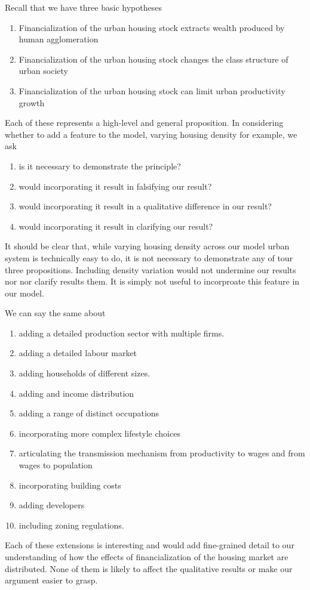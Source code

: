 Recall that we have three basic hypotheses
\begin{enumerate}
    \item Financialization of the urban housing stock extracts wealth produced by human agglomeration 
    \item Financialization of the urban housing stock changes the class structure of urban society
    \item Financialization of the urban housing stock can limit urban productivity growth
\end{enumerate}
Each  of these represents a high-level and general proposition. In considering whether to add a feature to the model, varying housing density for example, we ask 
\begin{enumerate}
    \item is it necessary to demonstrate the principle? 
    \item would incorporating it result in falsifying our result?
    \item would incorporating it result in a qualitative difference in our result?
    \item would incorporating it result in clarifying our result?
\end{enumerate}
It should be clear that, while varying housing density across our model urban system is technically easy to do, it is not necessary to demonstrate any of tour three propositions. Including density variation would not undermine our results nor nor  clarify results them. It is simply not useful to incorproate this feature in our model. 

We can say the same about 
\begin{enumerate}
    \item adding a detailed production sector with multiple firms.
    \item adding a detailed labour market
    \item adding households of different sizes.
    \item adding and income distribution
    \item adding a range of distinct occupations
    \item incorporating more complex lifestyle choices
    \item articulating the transmission mechanism from productivity to wages and from wages to population
    \item incorporating building costs
    \item adding developers
    \item including zoning regulations. 
\end{enumerate}
Each of these extensions is interesting and would add fine-grained detail to our understanding of how the effects of financialization of the housing market are distributed. None of them is likely to affect the qualitative results or make  our argument easier to grasp.


